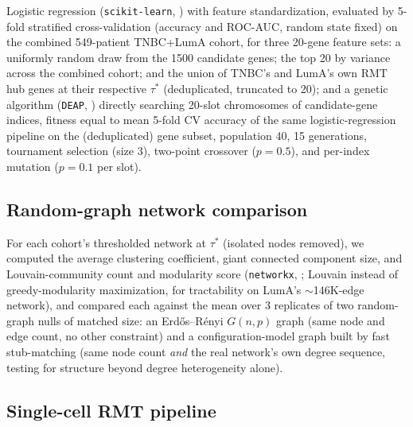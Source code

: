 \documentclass[11pt]{article}
\begin{document}
Logistic regression (\texttt{scikit-learn}, \citealp{sklearn2011}) with
feature standardization, evaluated by 5-fold stratified cross-validation
(accuracy and ROC-AUC, random state fixed) on the combined 549-patient
TNBC+LumA cohort, for three 20-gene feature sets: a uniformly random
draw from the 1500 candidate genes; the top 20 by variance across the
combined cohort; and the union of TNBC's and LumA's own RMT hub genes
at their respective $\tau^*$ (deduplicated, truncated to 20); and a
genetic algorithm (\texttt{DEAP}, \citealp{deap2012}) directly
searching 20-slot chromosomes of candidate-gene indices, fitness equal
to mean 5-fold CV accuracy of the same logistic-regression pipeline on
the (deduplicated) gene subset, population 40, 15 generations,
tournament selection (size 3), two-point crossover ($p=0.5$), and
per-index mutation ($p=0.1$ per slot).

\subsection{Random-graph network comparison}

For each cohort's thresholded network at $\tau^*$ (isolated nodes
removed), we computed the average clustering coefficient, giant
connected component size, and Louvain-community
\citep{blondel2008} count and modularity score
\citep{newmangirvan2004} (\texttt{networkx}, \citealp{networkx2008};
Louvain instead of greedy-modularity maximization, for tractability on
LumA's $\sim$146K-edge network), and compared each against the mean
over 3 replicates of two random-graph nulls of matched size: an
Erd\H{o}s--R\'enyi \citep{erdosrenyi1959} $G(n,p)$ graph (same node and
edge count, no other constraint) and a configuration-model graph
\citep{newmanstrogatzwatts2001} built by fast stub-matching (same node
count \emph{and} the real network's own degree sequence, testing for
structure beyond degree heterogeneity alone).

\subsection{Single-cell RMT pipeline}
\label{sec:singlecell-methods}
\end{document}

